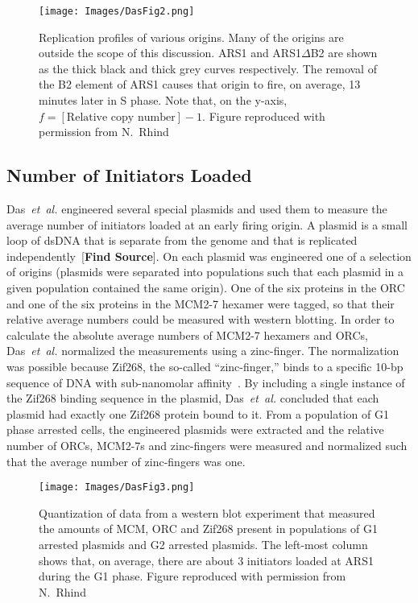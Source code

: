 {		\begin{figure}[tbh]
			\begin{center}
				\texttt{[image: Images/DasFig2.png]}
			\end{center}
				\caption[Replication profile of various origins]{\label{fig:Das2} Replication profiles of various origins.
					Many of the origins are outside the scope of this discussion.
					ARS1 and ARS1$\Delta$B2 are shown as the thick black and thick grey curves respectively.
					The removal of the B2 element of ARS1 causes that origin to fire, on average, 13 minutes later in S phase.
					Note that, on the y-axis, $f = [\text{Relative copy number}] - 1$.
					Figure reproduced with permission from N.~Rhind~\cite{Rhind}}
		\end{figure}
		
		
		\subsection{Number of Initiators Loaded}
		\label{subsec:NoInitiatorsLoaded}
		
		Das~\emph{et~al.} engineered several special plasmids and used them to measure the average number of initiators loaded at an early firing origin.
		A plasmid is a small loop of dsDNA that is separate from the genome and that is replicated independently~[\textbf{Find Source}].
		On each plasmid was engineered one of a selection of origins (plasmids were separated into populations such that each plasmid in a given population contained the same origin).
		One of the six proteins in the ORC and one of the six proteins in the MCM2-7 hexamer were tagged, so that their relative average numbers could be measured with western blotting.
		In order to calculate the absolute average numbers of MCM2-7 hexamers and ORCs, Das~\emph{et~al.} normalized the measurements using a zinc-finger.
		The normalization was possible because Zif268, the so-called ``zinc-finger,'' binds to a specific 10-bp sequence of DNA with sub-nanomolar affinity~\cite{ZincFingers}.
		By including a single instance of the Zif268 binding sequence in the plasmid, Das~\emph{et~al.} concluded that each plasmid had exactly one Zif268 protein bound to it.
		From a population of G1 phase arrested cells, the engineered plasmids were extracted and the relative number of ORCs, MCM2-7s and zinc-fingers were measured and normalized such that the average number of zinc-fingers was one.
		
		\begin{SCfigure}[1][tbh]
			\texttt{[image: Images/DasFig3.png]}
			\caption[Absolute number of loaded MCMs at ARS1]{\label{fig:Das3} Quantization of data from a western blot experiment that measured the amounts of MCM, ORC and Zif268 present in populations of G1 arrested plasmids and G2 arrested plasmids.
				The left-most column shows that, on average, there are about 3 initiators loaded at ARS1 during the G1 phase.
				Figure reproduced with permission from N.~Rhind~\cite{Rhind}}
		\end{SCfigure}
		
}
